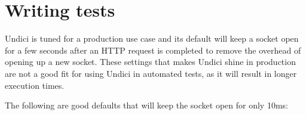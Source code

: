 \chapter{Writing tests}
\hypertarget{md__d_1_2_g_i_t_2_food_link_2foodlink_8client_2node__modules_2undici_2docs_2best-practices_2writing-tests}{}\label{md__d_1_2_g_i_t_2_food_link_2foodlink_8client_2node__modules_2undici_2docs_2best-practices_2writing-tests}
\label{md__d_1_2_g_i_t_2_food_link_2foodlink_8client_2node__modules_2undici_2docs_2best-practices_2writing-tests_autotoc_md21499}%
%


Undici is tuned for a production use case and its default will keep a socket open for a few seconds after an HTTP request is completed to remove the overhead of opening up a new socket. These settings that makes Undici shine in production are not a good fit for using Undici in automated tests, as it will result in longer execution times.

The following are good defaults that will keep the socket open for only 10ms\+:


\begin{DoxyCode}{0}
\DoxyCodeLine{}
\DoxyCodeLine{\})}
\DoxyCodeLine{}

\end{DoxyCode}
 